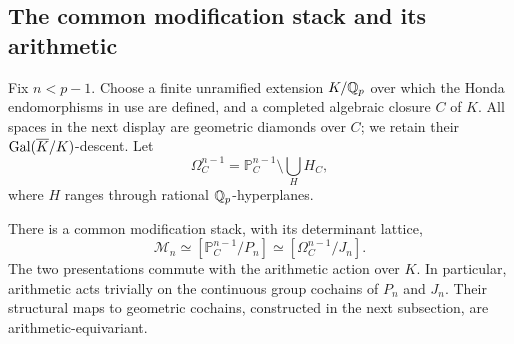 \subsection{The common modification stack and its arithmetic}

Fix $n<p-1$.  Choose a finite unramified extension $K/\mathbb Q_p$ over which the
Honda endomorphisms in use are defined, and a completed algebraic closure
$C$ of $K$.  All spaces in the next display are geometric diamonds over
$C$; we retain their $\operatorname{Gal}(\overline K/K)$-descent.  Let
\[
 \Omega^{n-1}_C=\mathbb P^{n-1}_C\setminus
       \bigcup_H H_C,
\]
where $H$ ranges through rational $\mathbb Q_p$-hyperplanes.

\begin{lemma}
\label{lem:const-modification-stack}
There is a common modification stack, with its determinant lattice,
\begin{equation}
 \mathcal M_n\simeq[\mathbb P^{n-1}_C/P_n]
             \simeq[\Omega^{n-1}_C/J_n].
 \label{eq:const-modification-stack}
\end{equation}
The two presentations commute with the arithmetic action over $K$.
In particular, arithmetic acts trivially on the continuous group
cochains of $P_n$ and $J_n$.  Their structural maps to geometric
cochains, constructed in the next subsection, are
arithmetic-equivariant.
\end{lemma}

